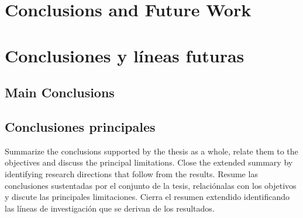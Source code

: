 %

{
  \chapter{Conclusions and Future Work}
}
{
  \chapter{Conclusiones y líneas futuras}
}
\label{cha:compendium-conclusions}

{
  \section{Main Conclusions}
}
{
  \section{Conclusiones principales}
}

{
  Summarize the conclusions supported by the thesis as a whole, relate them to the objectives and discuss the principal limitations. Close the extended summary by identifying research directions that follow from the results.
}
{
  Resume las conclusiones sustentadas por el conjunto de la tesis, relaciónalas con los objetivos y discute las principales limitaciones. Cierra el resumen extendido identificando las líneas de investigación que se derivan de los resultados.
}

